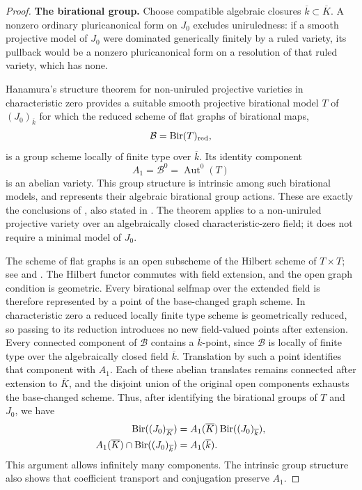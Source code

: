 \begin{proof}
\smallskip\noindent\textbf{The birational group.}\enspace
Choose compatible algebraic closures
$\overline k\subset\overline K$.  A nonzero ordinary
pluricanonical form on $J_0$ excludes uniruledness: if a smooth
projective model of $J_0$ were dominated generically finitely by a
ruled variety, its pullback would be a nonzero pluricanonical form
on a resolution of that ruled variety, which has none.

Hanamura's structure theorem for non-uniruled projective varieties
in characteristic zero provides a suitable smooth projective
birational model $T$ of $(J_0)_{\overline k}$ for which the reduced
scheme of flat graphs of birational maps,
\[
 \mathcal B=\operatorname{Bir}(T)_{\mathrm{red}},
\]
is a group scheme locally of finite type over $\overline k$.
Its identity component
\[
 A_1=\mathcal B^0=\operatorname{Aut}^0(T)
\]
is an abelian variety.  This group structure is intrinsic among
such birational models, and represents their algebraic birational
group actions.  These are exactly the conclusions of
\cite[Theorems~2.1--2.2]{Hanamura88}, also stated in
\cite[Theorems~3.8--3.9]{Blanc17}.  The theorem applies to a
non-uniruled projective variety over an algebraically closed
characteristic-zero field; it does not require a minimal model of
$J_0$.

The scheme of flat graphs is an open subscheme of the Hilbert scheme
of $T\times T$; see \cite[Definitions~1.6 and~1.8, Proposition~1.7]{Hanamura87}
and \cite[Proposition~3.7]{Blanc17}.  The Hilbert functor commutes with field extension, and the open graph
condition is geometric. Every birational selfmap over the extended
field is therefore represented by a point of the base-changed graph
scheme. In characteristic zero a reduced locally finite type scheme
is geometrically reduced, so passing to its reduction introduces no
new field-valued points after extension.
Every connected component of $\mathcal B$ contains a
$\overline k$-point, since $\mathcal B$ is locally of finite type
over the algebraically closed field $\overline k$.  Translation by
such a point identifies that component with $A_1$.  Each of these
abelian translates remains connected after extension to
$\overline K$, and the disjoint union of the original open
components exhausts the base-changed scheme.  Thus, after
identifying the birational groups of $T$ and $J_0$, we have
\begin{equation}
 \begin{split}
 \operatorname{Bir}((J_0)_{\overline K})
    &=A_1(\overline K)\operatorname{Bir}((J_0)_{\overline k}),\\
 A_1(\overline K)\cap\operatorname{Bir}((J_0)_{\overline k})
    &=A_1(\overline k).
 \end{split}
 \label{ds:components}
\end{equation}
This argument allows infinitely many components.  The intrinsic
group structure also shows that coefficient transport and
conjugation preserve $A_1$.


\end{proof}
